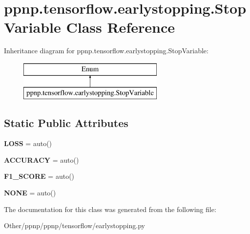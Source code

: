 \hypertarget{classppnp_1_1tensorflow_1_1earlystopping_1_1StopVariable}{}\section{ppnp.\+tensorflow.\+earlystopping.\+Stop\+Variable Class Reference}
\label{classppnp_1_1tensorflow_1_1earlystopping_1_1StopVariable}
Inheritance diagram for ppnp.\+tensorflow.\+earlystopping.\+Stop\+Variable\+:\begin{figure}[H]
\begin{center}
\leavevmode
\includegraphics[height=2.000000cm]{classppnp_1_1tensorflow_1_1earlystopping_1_1StopVariable}
\end{center}
\end{figure}
\subsection*{Static Public Attributes}
\begin{DoxyCompactItemize}
\item 
\mbox{\label{classppnp_1_1tensorflow_1_1earlystopping_1_1StopVariable_a371110c4f177b50676a6feddc062f5cc}} 
{\bfseries L\+O\+SS} = auto()
\item 
\mbox{\label{classppnp_1_1tensorflow_1_1earlystopping_1_1StopVariable_a1aac9b010a554dac15abeaaa74a4bac6}} 
{\bfseries A\+C\+C\+U\+R\+A\+CY} = auto()
\item 
\mbox{\label{classppnp_1_1tensorflow_1_1earlystopping_1_1StopVariable_a0b8e27565aa011e78a4098ff1e0461ba}} 
{\bfseries F1\+\_\+\+S\+C\+O\+RE} = auto()
\item 
\mbox{\label{classppnp_1_1tensorflow_1_1earlystopping_1_1StopVariable_a8e6630375248d810fe8df7b444c12824}} 
{\bfseries N\+O\+NE} = auto()
\end{DoxyCompactItemize}


The documentation for this class was generated from the following file\+:\begin{DoxyCompactItemize}
\item 
Other/ppnp/ppnp/tensorflow/earlystopping.\+py\end{DoxyCompactItemize}
